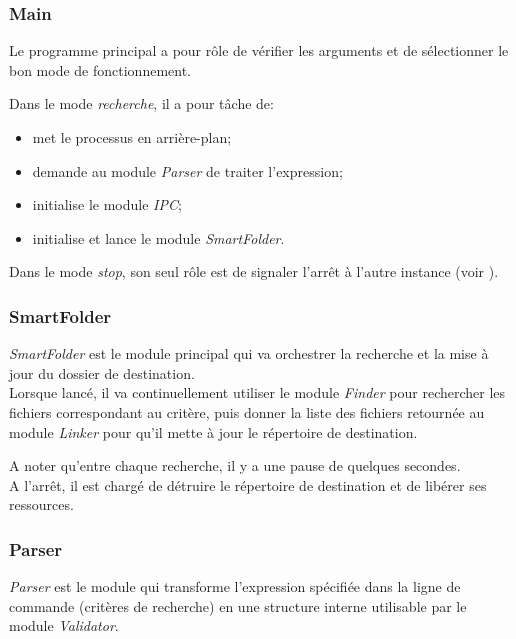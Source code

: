 \documentclass[11pt, a4paper]{article}
\begin{document}
\newpage

\subsubsection{Main}

Le programme principal a pour rôle de vérifier les arguments et de sélectionner le bon mode de fonctionnement.

Dans le mode \textit{recherche}, il a pour tâche de:
\begin{itemize}
    \item met le processus en arrière-plan;
    \item demande au module \textit{Parser} de traiter l'expression;
    \item initialise le module \textit{IPC};
    \item initialise et lance le module \textit{SmartFolder}.\\
\end{itemize}

Dans le mode \textit{stop}, son seul rôle est de signaler l'arrêt à l'autre instance (voir ).

\subsubsection{SmartFolder}
\textit{SmartFolder} est le module principal qui va orchestrer la recherche et la mise à jour du dossier de destination. \\

Lorsque lancé, il va continuellement utiliser le module \textit{Finder} pour rechercher les fichiers correspondant au critère,
puis donner la liste des fichiers retournée au module \textit{Linker} pour qu'il mette à jour le répertoire de destination.

A noter qu'entre chaque recherche, il y a une pause de quelques secondes. \\

A l'arrêt, il est chargé de détruire le répertoire de destination et de libérer ses ressources.

\subsubsection{Parser}
\textit{Parser} est le module qui transforme
l'expression spécifiée dans la ligne de commande (critères de recherche) en une structure interne utilisable par le module \textit{Validator}. \\
\end{document}
